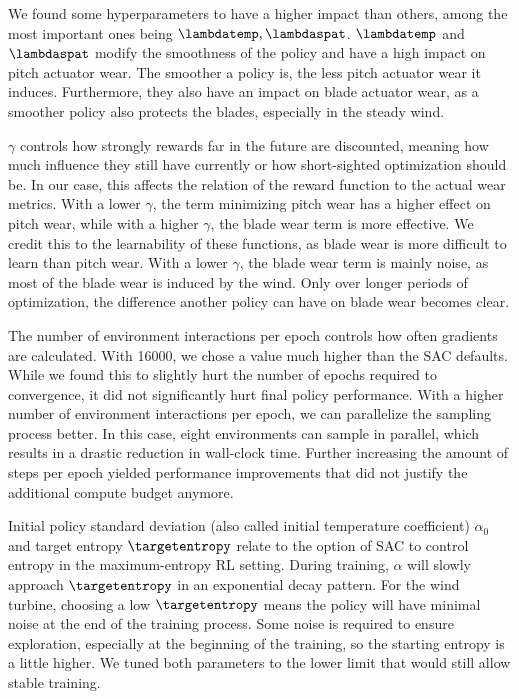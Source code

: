 We found some hyperparameters to have a higher impact than others, among the most important ones being $\lambdatemp, \lambdaspat$. $\lambdatemp$ and $\lambdaspat$ modify the smoothness of the policy and have a high impact on pitch actuator wear. The smoother a policy is, the less pitch actuator wear it induces. Furthermore, they also have an impact on blade actuator wear, as a smoother policy also protects the blades, especially in the steady wind. 

$\gamma$ controls how strongly rewards far in the future are discounted, meaning how much influence they still have currently or how short-sighted optimization should be. In our case, this affects the relation of the reward function to the actual wear metrics. With a lower $\gamma$, the term minimizing pitch wear has a higher effect on pitch wear, while with a higher $\gamma$, the blade wear term is more effective. We credit this to the learnability of these functions, as blade wear is more difficult to learn than pitch wear. With a lower $\gamma$, the blade wear term is mainly noise, as most of the blade wear is induced by the wind. Only over longer periods of optimization, the difference another policy can have on blade wear becomes clear.

The number of environment interactions per epoch controls how often gradients are calculated. With 16000, we chose a value much higher than the \ac{SAC} defaults. While we found this to slightly hurt the number of epochs required to convergence, it did not significantly hurt final policy performance. With a higher number of environment interactions per epoch, we can parallelize the sampling process better. In this case, eight environments can sample in parallel, which results in a drastic reduction in wall-clock time. Further increasing the amount of steps per epoch yielded performance improvements that did not justify the additional compute budget anymore.

Initial policy standard deviation (also called initial temperature coefficient) $\alpha_0$ and target entropy $\targetentropy$ relate to the option of \ac{SAC} to control entropy in the maximum-entropy RL setting. During training, $\alpha$ will slowly approach $\targetentropy$ in an exponential decay pattern. For the wind turbine, choosing a low $\targetentropy$ means the policy will have minimal noise at the end of the training process. Some noise is required to ensure exploration, especially at the beginning of the training, so the starting entropy is a little higher. We tuned both parameters to the lower limit that would still allow stable training.

